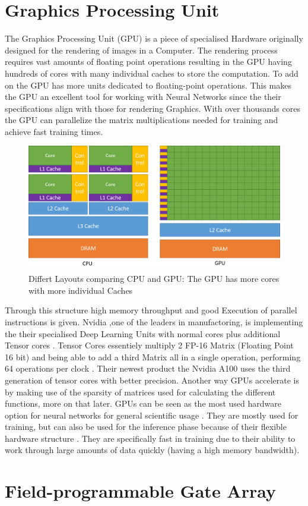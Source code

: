 \documentclass[conference]{IEEEtran}
\begin{document}
\section{Graphics Processing Unit}
The Graphics Processing Unit (GPU) is a piece of specialised Hardware originally designed for the rendering of images in a Computer. The rendering process requires vast amounts of floating point operations resulting in the GPU having hundreds of cores with many individual caches to store the computation. To add on the GPU has more units dedicated to floating-point operations. This makes the GPU an excellent tool for working with Neural Networks since the their specifications align with those for rendering Graphics. With over thousands cores the GPU can parallelize the matrix multiplications needed for training and achieve fast training times. 
\begin{figure}[h]
	\caption{Differt Layouts comparing CPU and GPU: The GPU has more cores with more individual Caches \cite{intelpic_comparison}}
	\centering
	\includegraphics[width=\linewidth]{pictures/intel_comparison.png}
\end{figure}

Through this structure high memory throughput and good Execution of parallel instructions is given. Nvidia ,one of the leaders in manufactoring, is implementing the their specialised Deep Learning Units with normal cores plus additional Tensor cores \cite{nvidiav100}. Tensor Cores essentiely multiply 2 FP-16 Matrix (Floating Point 16 bit) and being able to add a third Matrix all in a single operation, performing 64 operations per clock \cite{tensorcores}. Their newest product the Nvidia A100 uses the third generation of tensor cores with better precision.
Another way GPUs accelerate is by making use of the sparsity of matrices used for calculating the different functions, more on that later.
GPUs can be seen as the most used hardware option for neural networks for general scientific usage \cite{mostusedgpu}. They are mostly used for training, but can also be used for the inference phase because of their flexible hardware structure \cite{capra2020updated}. They are specifically fast in training due to their ability to work through large amounts of data quickly (having a high memory bandwidth).

\section{Field-programmable Gate Array}


\newpage
\quad
\newpage


\end{document}
